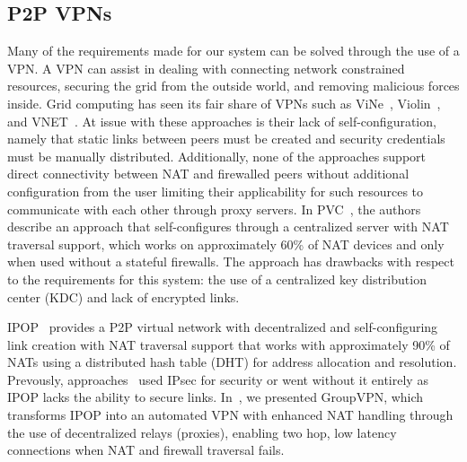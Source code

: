 \documentclass{sig-alternate}
\begin{document}
\subsection{P2P VPNs}
Many of the requirements made for our system can be solved through the use of a
VPN.  A VPN can assist in dealing with connecting network constrained resources,
securing the grid from the outside world, and removing malicious forces inside.
Grid computing has seen its fair share of VPNs such as ViNe~\cite{vine},
Violin~\cite{violin}, and VNET~\cite{vnet}.  At issue with these approaches is
their lack of self-configuration, namely that static links between peers must
be created and security credentials must be manually distributed.
Additionally, none of the approaches support direct connectivity between NAT
and firewalled peers without additional configuration from the user limiting
their applicability for such resources to communicate with each other through
proxy servers.  In PVC~\cite{pvc}, the authors describe an approach that
self-configures through a centralized server with NAT traversal support, which
works on approximately 60\% of NAT devices and only when used without a
stateful firewalls.  The approach has drawbacks with respect to the
requirements for this system: the use of a centralized key distribution
center (KDC) and lack of encrypted links.

IPOP~\cite{ipop} provides a P2P virtual network with decentralized and
self-configuring link creation with NAT traversal support that works with
approximately 90\% of NATs using a distributed hash table (DHT) for address
allocation and resolution.  Prevously, approaches~\cite{grid_appliance} used
IPsec for security or went without it entirely as IPOP lacks the ability to
secure links.  In~\cite{groupvpn}, we presented GroupVPN, which transforms IPOP
into an automated VPN with enhanced NAT handling through the use of
decentralized relays (proxies), enabling two hop, low latency connections when
NAT and firewall traversal fails.
\end{document}
